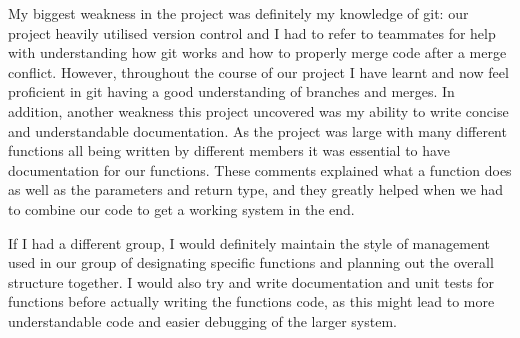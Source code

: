 \documentclass[10pt]{article}
\begin{document}
My biggest weakness in the project was definitely my knowledge of git: our project heavily utilised version control and I had to refer to teammates for help with understanding how git works and how to properly merge code after a merge conflict. However, throughout the course of our project I have learnt and now feel proficient in git having a good understanding of branches and merges. In addition, another weakness this project uncovered was my ability to write concise and understandable documentation. As the project was large with many different functions all being written by different members it was essential to have documentation for our functions. These comments explained what a function does as well as the parameters and return type, and they greatly helped when we had to combine our code to get a working system in the end.

If I had a different group, I would definitely maintain the style of management used in our group of designating specific functions and planning out the overall structure together. I would also try and write documentation and unit tests for functions before actually writing the functions code, as this might lead to more understandable code and easier debugging of the larger system.
\end{document}
